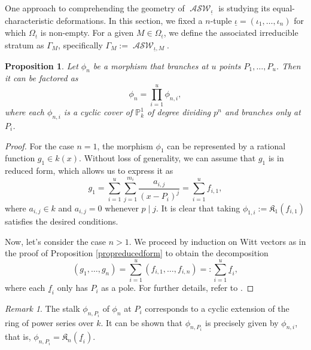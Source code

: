 \documentclass{compositio}
\newtheorem{proposition}[theorem]{Proposition}
\theoremstyle{remark}
\theoremstyle{remark}
\newtheorem{remark}[theorem]{Remark}
\DeclareMathOperator{\ASW}{\mathcal{ASW}}
\begin{document}
One approach to comprehending the geometry of $\ASW_{\underline{\iota}}$ is studying its equal-characteristic deformations. In this section, we fixed a $n$-tuple $\underline{\iota}=(\iota_1, \ldots, \iota_n)$ for which $\Omega_{\underline{\iota}}$ is non-empty. For a given $M \in \Omega_{\underline{\iota}}$, we define the associated irreducible stratum as $\Gamma_M$, specifically $\Gamma_M:=\ASW_{\underline{\iota},M}$.



\begin{proposition}
Let $\phi_n$ be a morphism that branches at $u$ points $P_1, \ldots, P_u$. Then it can be factored as
\begin{equation*}
\phi_n = \prod_{i=1}^u \phi_{n,i},
\end{equation*}
where each $\phi_{n,i}$ is a cyclic cover of $\mathbb{P}^1_k$ of degree dividing $p^n$ and branches only at $P_i$.
\end{proposition}

\begin{proof}
    For the case $n=1$, the morphism $\phi_1$ can be represented by a rational function $g_1 \in k(x)$. Without loss of generality, we can assume that $g_1$ is in reduced form, which allows us to express it as
\begin{equation*}
g_1 = \sum_{i=1}^u \sum_{j=1}^{m_i} \frac{a_{i,j}}{(x-P_i)^j} = \sum_{i=1}^u f_{i,1},
\end{equation*}
where $a_{i,j} \in k$ and $a_{i,j}=0$ whenever $p \mid j$. It is clear that taking $\phi_{1,i}:=\mathfrak{K}_1(f_{i,1})$ satisfies the desired conditions. 

Now, let's consider the case $n>1$. We proceed by induction on Witt vectors as in the proof of Proposition \ref{propreducedform} to obtain the decomposition
\begin{equation*}
    (g_1, \ldots, g_n) = \sum_{i=1}^u (f_{i,1}, \ldots, f_{i,n}) =: \sum_{i=1}^u \underline{f}_i,
\end{equation*}
where each $\underline{f}_i$ only has $P_i$ as a pole. For further details, refer to \cite[Proposition 5.1]{2020arXiv201013614D}.
\end{proof}


\begin{remark}
The stalk $\phi_{n,P_i}$ of $\phi_n$ at $P_i$ corresponds to a cyclic extension of the ring of power series over $k$. It can be shown that $\phi_{n,P_i}$ is precisely given by $\phi_{n,i}$, that is, $\phi_{n,P_i}=\mathfrak{K}_n(\underline{f}_i)$.
\end{remark}
\end{document}
